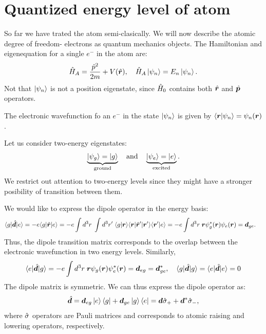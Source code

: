 \section{Quantized energy level of atom}
So far we have trated the atom semi-clasically. We will now describe the atomic degree of freedom-
electrons as quantum mechanics objects.
The Hamiltonian and eigenequation for a single $e^-$ in the atom are:
\begin{align}
    \hat{H}_A=\frac{\hat{p}^2}{2m}+V(\hat{\bm{r}}),\quad\hat{H}_A\left|\psi_n\right\rangle=E_n\left|\psi_n\right\rangle.
\end{align}
Not that $\left|\psi_n\right\rangle$ is not a position eigenstate, since $\hat{H}_0$ contains both $\hat{\bm{r}}$ and $\hat{\bm{p}}$ operators.

The electronic wavefunction fo an $e^-$ in the state $\left|\psi_n\right\rangle$ is given by $\langle\bm{r}|\psi_n\rangle=\psi_n(\bm{r})$.

Let us consider two-energy eigenstates:
\begin{align}
    \underbrace{\left|\psi_g\right\rangle=\left|g\right\rangle}_{\text{ground}}\quad\text{and}\quad\underbrace{\left|\psi_e\right\rangle=\left|e\right\rangle}_{\text{excited}}.
\end{align}
We restrict out attention to two-energy levels since they might have a stronger posibility of transition between them.

We would like to express the dipole operator in the energy basis:
\begin{align*}
    \langle g|\hat{\bm{d}}|e\rangle&=-e\langle g|\hat{\bm{r}}|e\rangle=-e\int d^3r\;\int d^3r'\;\langle g|\bm{r}\rangle\langle\bm{r}|\hat{\bm{r}}'|\bm{r}'\rangle\langle\bm{r}'|e\rangle=-e\int d^3r\;\bm{r}\psi_g^*(\bm{r})\psi_e(\bm{r})=\bm{d}_{ge}.
\end{align*}
Thus, the dipole transition matrix corresponds to the overlap between the electronic wavefunction in two energy levels. Similarly,
\begin{align*}
    \langle e|\hat{\bm{d}}|g\rangle=-e\int d^3r\;\bm{r}\psi_g(\bm{r})\psi_e^*(\bm{r})=\bm{d}_{eg}=\bm{d}_{ge}^*,\quad
    \langle g|\hat{\bm{d}}|g\rangle=\langle e|\hat{\bm{d}}|e\rangle=0
\end{align*}
The dipole matrix is symmetric. We can thus express the dipole operator as:
\begin{align}
    \hat{\bm{d}}=\bm{d}_{eg}\left|e\right\rangle\left\langle g\right|+\bm{d}_{ge}\left|g\right\rangle\left\langle e\right|=\bm{d}\hat{\sigma}_++\bm{d}^*\hat{\sigma}_-,
\end{align}
where $\hat{\sigma}$ operators are Pauli matrices and corresponds to atomic raising and lowering operators, respectively.

